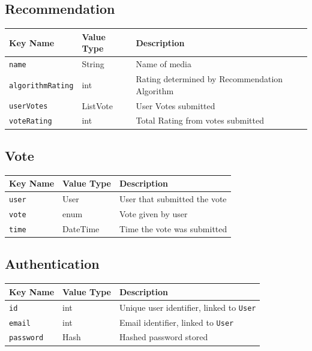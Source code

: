 \documentclass[12pt, titlepage]{article}
\begin{document}
\subsection{Recommendation}
\begin{tabularx}{\textwidth}{|p{3.3cm}|p{3cm}|X|}
	\hline
	{\bf Key Name} & {\bf Value Type} & {\bf Description}\\
	\hline
	\verb_name_ & String & Name of media\\
	\hline
	\verb_algorithmRating_ & int & Rating determined by Recommendation Algorithm \\
	\hline
	\verb_userVotes_ & List\textlangle{}Vote\textrangle & User Votes submitted\\
	\hline
	\verb_voteRating_ & int & Total Rating from votes submitted\\
	\hline
\end{tabularx}

\subsection{Vote}
\begin{tabularx}{\textwidth}{|p{3.3cm}|p{3cm}|X|}
	\hline
	{\bf Key Name} & {\bf Value Type} & {\bf Description}\\
	\hline
	\verb_user_ & User & User that submitted the vote \\
	\hline
	\verb_vote_ & enum & Vote given by user \\
	\hline
	\verb_time_ & DateTime & Time the vote was submitted \\
	\hline
\end{tabularx}

\subsection{Authentication}
\begin{tabularx}{\textwidth}{|p{3.3cm}|p{3cm}|X|}
\hline
{\bf Key Name} & {\bf Value Type} & {\bf Description}\\
\hline
\verb_id_ & int & Unique user identifier, linked to \verb_User_ \\
\hline
\verb_email_ & int & Email identifier, linked to \verb_User_ \\
\hline
\verb_password_ & Hash & Hashed password stored\\
\hline
\end{tabularx}
\end{document}
